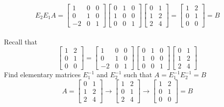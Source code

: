 \[
  E_2E_1A = \begin{bmatrix}
    1 & 0 & 0 \\
    0 & 1 & 0 \\
    -2 & 0 & 1
  \end{bmatrix} \begin{bmatrix}
    0 & 1 & 0 \\
    1 & 0 & 0 \\
    0 & 0 & 1
  \end{bmatrix} \begin{bmatrix}
    0 & 1 \\
    1 & 2 \\
    2 & 4
  \end{bmatrix} = \begin{bmatrix}
    1 & 2 \\
    0 & 1 \\
    0 & 0
  \end{bmatrix} = B
\]
\\[8pt]
Recall that
\[
  \begin{bmatrix}
    1 & 2 \\
    0 & 1 \\
    0 & 0
  \end{bmatrix} = \begin{bmatrix}
    1 & 0 & 0 \\
    0 & 1 & 0 \\
    -2 & 0 & 1
  \end{bmatrix} \begin{bmatrix}
    0 & 1 & 0 \\
    1 & 0 & 0 \\
    0 & 0 & 1
  \end{bmatrix} \begin{bmatrix}
    0 & 1 \\
    1 & 2 \\
    2 & 4
  \end{bmatrix}
\]
Find elementary matrices $E_1^{-1}$ and $E_2^{-1}$ such that $A = E_1^{-1}E_2^{-1} = B$ 
\\[8pt]
\[
  A = \begin{bmatrix}
    0 & 1 \\
    1 & 2 \\
    2 & 4
  \end{bmatrix} \rightarrow \begin{bmatrix}
    1 & 2 \\
    0 & 1 \\
    2 & 4
  \end{bmatrix} \rightarrow \begin{bmatrix}
    1 & 2 \\
    0 & 1 \\
    0 & 0
  \end{bmatrix} = B
\]
